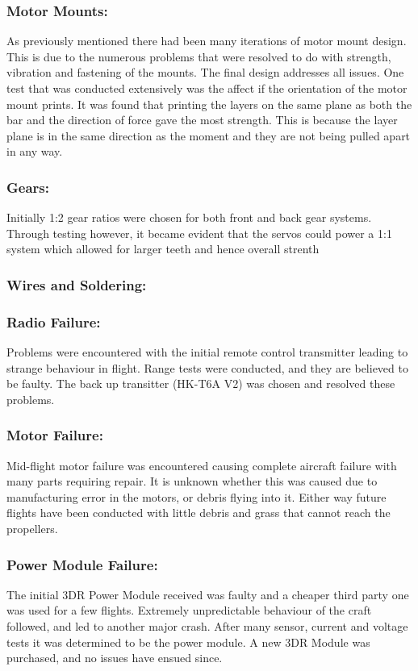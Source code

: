 \subsubsection*{Motor Mounts:} As previously mentioned there had been many iterations of motor mount design. This is due to the numerous problems that were resolved to do with strength, vibration and fastening of the mounts. The final design addresses all issues. One test that was conducted extensively was the affect if the orientation of the motor mount prints. It was found that printing the layers on the same plane as both the bar and the direction of force gave the most strength. This is because the layer plane is in the same direction as the moment and they are not being pulled apart in any way.

\subsubsection*{Gears:} Initially 1:2 gear ratios were chosen for both front and back gear systems. Through testing however, it became evident that the servos could power a 1:1 system which allowed for larger teeth and hence overall strenth 

\subsubsection*{Wires and Soldering:}  

\subsubsection*{Radio Failure:} Problems were encountered with the initial remote control  transmitter leading to strange behaviour in flight. Range tests were conducted, and they are believed to be faulty. The back up transitter (HK-T6A V2) was chosen and resolved these problems.

\subsubsection*{Motor Failure:} Mid-flight motor failure was encountered causing complete aircraft failure with many parts requiring repair. It is unknown whether this was caused due to manufacturing error in the motors, or debris flying into it. Either way future flights have been conducted with little debris and grass that cannot reach the propellers. 

\subsubsection*{Power Module Failure:}  The initial 3DR Power Module received was faulty and a cheaper third party one was used for a few flights. Extremely unpredictable behaviour of the craft followed, and led to another major crash. After many sensor, current and voltage tests it was determined to be the power module. A new 3DR Module was purchased, and no issues have ensued since.  

